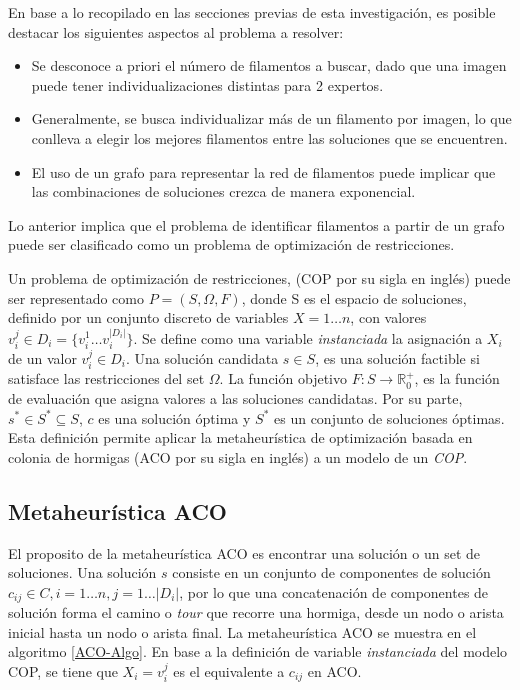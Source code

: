 En base a lo recopilado en las secciones previas de esta investigaci\'on, es posible destacar los siguientes aspectos al problema a resolver:

\begin{itemize}
    \item Se desconoce a priori el n\'umero de filamentos a buscar, dado que una imagen puede tener individualizaciones distintas para 2 expertos.
    \item Generalmente, se busca individualizar m\'as de un filamento por imagen, lo que conlleva a elegir los mejores filamentos entre las soluciones que se encuentren.
    \item El uso de un grafo para representar la red de filamentos puede implicar que las combinaciones de soluciones crezca de manera exponencial.
\end{itemize}

Lo anterior implica que el problema de identificar filamentos a partir de un grafo puede ser clasificado como un problema de optimizaci\'on de restricciones\cite{blum2011hybrid}.

Un problema de optimización de restricciones, (COP por su sigla en ingl\'es) puede ser representado como $P = (S, \Omega, F)$, donde S es el espacio de soluciones, definido por un conjunto discreto de variables $X = 1 \dotsc n$, con valores $v_{i}^{j} \in D_{i} = \{v_{i}^{1} \dotsc  v_{i}^{|D_{i}|}\}$. Se define como una variable {\it instanciada} la asignaci\'on a $X_i$ de un valor $v_{i}^{j} \in D_i$. Una solución candidata $s \in S$, es una soluci\'on factible si satisface las restricciones del set $\Omega$. La funci\'on objetivo $F: S\rightarrow \mathbb R_{0}^{+}$, es la funci\'on de evaluaci\'on que asigna valores a las soluciones candidatas. Por su parte, $s^{*} \in S^{*} \subseteq S $, $c$ es una soluci\'on \'optima y $S^{*}$ es un conjunto de soluciones \'optimas\cite{socha2008ant}.
Esta definici\'on permite aplicar la metaheur\'istica de optimizaci\'on basada en colonia de hormigas (ACO por su sigla en ingl\'es) a un modelo de un {\it COP}.

\subsection{Metaheur\'istica ACO}
El proposito de la metaheur\'istica ACO es encontrar una soluci\'on o un set de soluciones. Una soluci\'on $s$ consiste en un conjunto de componentes de soluci\'on $c_{ij} \in C, i = 1 \dotsc n, j = 1 \dotsc |D_i|$, por lo que una concatenaci\'on de componentes de soluci\'on forma el camino o {\it tour} que recorre una hormiga, desde un nodo o arista inicial hasta un nodo o arista final. La metaheur\'istica ACO se muestra en el algoritmo \ref{ACO-Algo}. En base a la definici\'on de variable {\it instanciada} del modelo COP, se tiene que $X_i = v_{i}^{j}$ es el equivalente a $c_{ij}$ en ACO.

